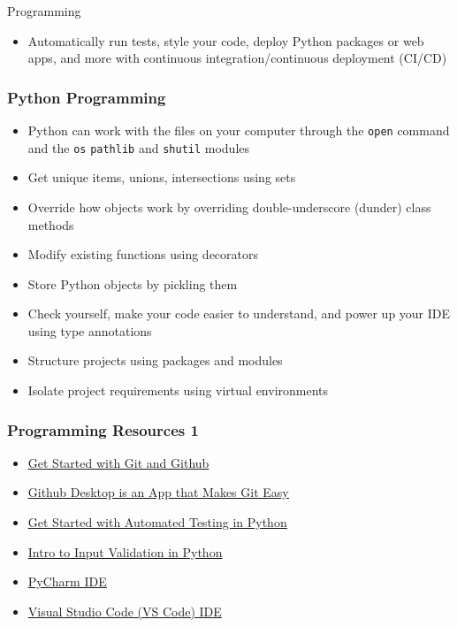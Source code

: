 \documentclass[handout, 11pt]{beamer}
\begin{document}
\begin{section}{Programming}
\begin{frame}
\begin{itemize}
\vfill
\item Automatically run tests, style your code, deploy Python packages or web apps, and more with continuous integration/continuous deployment (CI/CD)
\end{itemize}
\end{frame}
\begin{frame}
\frametitle{Python Programming}
\begin{itemize}
\item Python can work with the files on your computer through the
\texttt{open}
command and the
\texttt{os}
\texttt{pathlib}
and
\texttt{shutil}
modules
\vfill
\item Get unique items, unions, intersections using sets
\vfill
\item Override how objects work by overriding double-underscore (dunder) class methods
\vfill
\item Modify existing functions using decorators
\vfill
\item Store Python objects by pickling them
\vfill
\item Check yourself, make your code easier to understand, and power up your IDE using type annotations
\vfill
\item Structure projects using packages and modules
\vfill
\item Isolate project requirements using virtual environments
\end{itemize}
\end{frame}
\begin{frame}
\frametitle{Programming Resources 1}
\begin{itemize}
\small
\vfill
\item \textcolor{blue}{\underline{\href{https://product.hubspot.com/blog/git-and-github-tutorial-for-beginners}{Get Started with Git and Github}}}
\vfill
\item \textcolor{blue}{\underline{\href{https://desktop.github.com/}{Github Desktop is an App that Makes Git Easy}}}
\vfill
\item \textcolor{blue}{\underline{\href{https://realpython.com/python-testing/}{Get Started with Automated Testing in Python}}}
\vfill
\item \textcolor{blue}{\underline{\href{https://www.youtube.com/watch?v=IL3eZYiV70g}{Intro to Input Validation in Python}}}
\vfill
\item \textcolor{blue}{\underline{\href{https://www.jetbrains.com/pycharm/}{PyCharm IDE}}}
\vfill
\item \textcolor{blue}{\underline{\href{https://code.visualstudio.com/}{Visual Studio Code (VS Code) IDE}}}

\end{itemize}
\end{frame}
\end{section}
\end{document}
